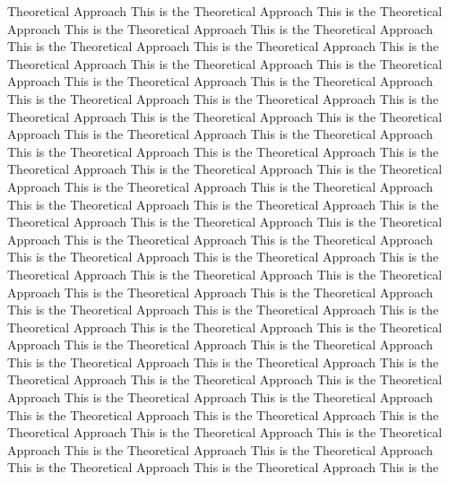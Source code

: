 \documentclass[twocolumn,a4paper,10pt]{article}
\begin{document}
Theoretical Approach This is the Theoretical Approach This is the Theoretical Approach This is the Theoretical Approach This is the Theoretical Approach This is the Theoretical Approach This is the Theoretical Approach This is the Theoretical Approach This is the Theoretical Approach This is the Theoretical Approach This is the Theoretical Approach This is the Theoretical Approach This is the Theoretical Approach This is the Theoretical Approach This is the Theoretical Approach This is the Theoretical Approach This is the Theoretical Approach This is the Theoretical Approach This is the Theoretical Approach This is the Theoretical Approach This is the Theoretical Approach This is the Theoretical Approach This is the Theoretical Approach This is the Theoretical Approach This is the Theoretical Approach This is the Theoretical Approach This is the Theoretical Approach This is the Theoretical Approach This is the Theoretical Approach This is the Theoretical Approach This is the Theoretical Approach This is the Theoretical Approach This is the Theoretical Approach This is the Theoretical Approach This is the Theoretical Approach This is the Theoretical Approach This is the Theoretical Approach This is the Theoretical Approach This is the Theoretical Approach This is the Theoretical Approach This is the Theoretical Approach This is the Theoretical Approach This is the Theoretical Approach This is the Theoretical Approach This is the Theoretical Approach This is the Theoretical Approach This is the Theoretical Approach This is the Theoretical Approach This is the Theoretical Approach This is the Theoretical Approach This is the Theoretical Approach This is the Theoretical Approach This is the Theoretical Approach This is the Theoretical Approach This is the Theoretical Approach This is the Theoretical Approach This is the Theoretical Approach This is the Theoretical Approach This is the Theoretical Approach This is the Theoretical Approach This is the Theoretical Approach This is the Theoretical Approach This is the Theoretical Approach This is the 
\end{document}
